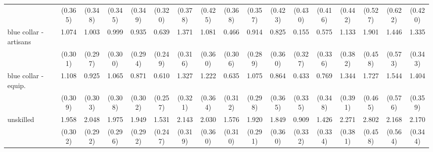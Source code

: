 {\begin{tabular}{l*{16}{c}}
                    &     (0.365)         &     (0.348)         &     (0.345)         &     (0.349)         &     (0.320)         &     (0.378)         &     (0.425)         &     (0.368)         &     (0.357)         &     (0.423)         &     (0.430)         &     (0.416)         &     (0.442)         &     (0.527)         &     (0.622)         &     (0.420)         \\
[1em]
blue collar - artisans&       1.074\sym{***}&       1.003\sym{***}&       0.999\sym{***}&       0.935\sym{**} &       0.639\sym{*}  &       1.371\sym{***}&       1.081\sym{**} &       0.466         &       0.914\sym{**} &       0.825\sym{*}  &       0.155         &       0.575         &       1.133\sym{**} &       1.901\sym{***}&       1.446\sym{*}  &       1.335\sym{***}\\
                    &     (0.301)         &     (0.297)         &     (0.300)         &     (0.294)         &     (0.249)         &     (0.316)         &     (0.360)         &     (0.306)         &     (0.289)         &     (0.360)         &     (0.327)         &     (0.336)         &     (0.382)         &     (0.458)         &     (0.573)         &     (0.343)         \\
[1em]
blue collar - equip.&       1.108\sym{***}&       0.925\sym{**} &       1.065\sym{***}&       0.871\sym{**} &       0.610\sym{*}  &       1.327\sym{***}&       1.222\sym{***}&       0.635\sym{*}  &       1.075\sym{***}&       0.864\sym{*}  &       0.433         &       0.769\sym{*}  &       1.344\sym{***}&       1.727\sym{***}&       1.544\sym{**} &       1.404\sym{***}\\
                    &     (0.309)         &     (0.303)         &     (0.308)         &     (0.302)         &     (0.257)         &     (0.321)         &     (0.364)         &     (0.312)         &     (0.298)         &     (0.365)         &     (0.335)         &     (0.348)         &     (0.391)         &     (0.465)         &     (0.576)         &     (0.359)         \\
[1em]
unskilled           &       1.958\sym{***}&       2.048\sym{***}&       1.975\sym{***}&       1.949\sym{***}&       1.531\sym{***}&       2.143\sym{***}&       2.030\sym{***}&       1.576\sym{***}&       1.920\sym{***}&       1.849\sym{***}&       0.909\sym{**} &       1.426\sym{***}&       2.271\sym{***}&       2.802\sym{***}&       2.168\sym{***}&       2.170\sym{***}\\
                    &     (0.302)         &     (0.292)         &     (0.296)         &     (0.292)         &     (0.247)         &     (0.319)         &     (0.360)         &     (0.310)         &     (0.291)         &     (0.360)         &     (0.332)         &     (0.334)         &     (0.381)         &     (0.458)         &     (0.564)         &     (0.344)         \\

\end{tabular}}
